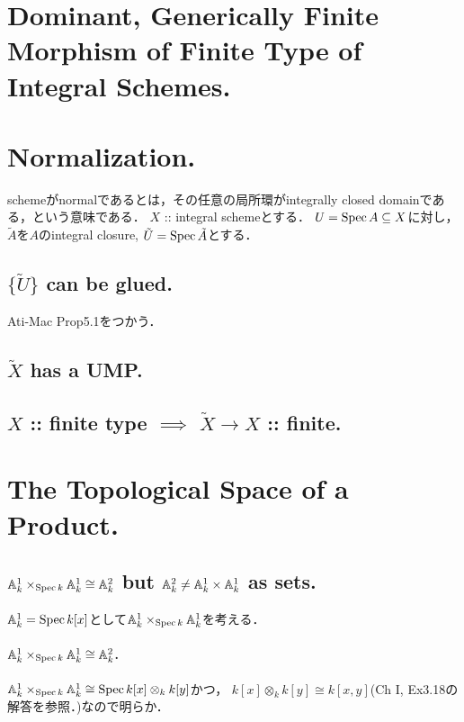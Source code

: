 \documentclass[a4paper]{jsarticle}
\begin{document}
\section{Dominant, Generically Finite Morphism of Finite Type of Integral Schemes.} %

\section{Normalization.} %
    schemeがnormalであるとは，その任意の局所環がintegrally closed domainである，という意味である．
    $X$ :: integral schemeとする．
    $U=\operatorname{Spec} A \subseteq X$に対し，$\tilde{A}$を$A$のintegral closure, $\tilde{U}=\operatorname{Spec} \tilde{A}$とする．

    \subsection{$\{ \tilde{U} \}$ can be glued.}
    Ati-Mac Prop5.1をつかう．

    \subsection{$\tilde{X}$ has a UMP.}

    \subsection{$X$ :: finite type $\implies$ $\tilde{X} \to X$ :: finite.}

\section{The Topological Space of a Product.} %
    \subsection{$\mathbb{A}^1_k \times_{\operatorname{Spec} k} \mathbb{A}^1_k \cong \mathbb{A}^2_k$ but $\mathbb{A}^2_k \neq \mathbb{A}^1_k \times \mathbb{A}^1_k$ as sets.}
    $\mathbb{A}_k^1=\operatorname{Spec} k[x]$として$\mathbb{A}^1_k \times_{\operatorname{Spec} k} \mathbb{A}^1_k$を考える．

    \paragraph{$\mathbb{A}^1_k \times_{\operatorname{Spec} k} \mathbb{A}^1_k \cong \mathbb{A}^2_k$.}
    $\mathbb{A}^1_k \times_{\operatorname{Spec} k} \mathbb{A}^1_k \cong \operatorname{Spec} k[x] \otimes_k k[y]$かつ，
    $k[x] \otimes_k k[y] \cong k[x,y]$(Ch I, Ex3.18の解答を参照．)なので明らか．
\end{document}
